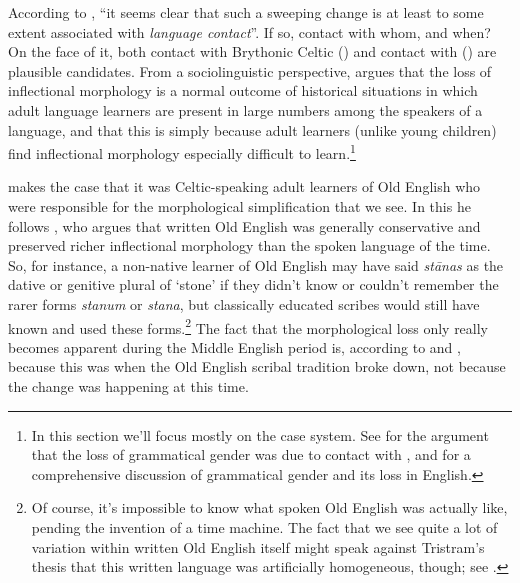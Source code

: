 According to \citet[203]{Milroy1992}, ``it seems clear that such a sweeping change is at least to some extent associated with \emph{language contact}''. If so, contact with whom, and when? On the face of it, both contact with Brythonic Celtic () and contact with  () are plausible candidates. From a sociolinguistic perspective, \citet{Trudgill2011} argues that the loss of inflectional morphology is a normal outcome of historical situations in which adult language learners are present in large numbers among the speakers of a language, and that this is simply because adult learners (unlike young children) find inflectional morphology especially difficult to learn.\footnote{In this section we'll focus mostly on the case system. See \citet[228--231]{McWhorter2002} for the argument that the loss of grammatical gender was due to contact with , and \citet{Curzan2003} for a comprehensive discussion of grammatical gender and its loss in English.}

\citet[Chapter 2]{Trudgill2011} makes the case that it was Celtic-speaking adult learners of Old English who were responsible for the morphological simplification that we see. In this he follows \citet{Tristram2004}, who argues that written Old English was generally conservative and preserved richer inflectional morphology than the spoken language of the time. So, for instance, a non-native learner of Old English may have said \emph{stānas} as the dative or genitive plural of `stone' if they didn't know or couldn't remember the rarer forms \emph{stanum} or \emph{stana}, but classically educated scribes would still have known and used these forms.\footnote{Of course, it's impossible to know what spoken Old English was actually like, pending the invention of a time machine. The fact that we see quite a lot of variation within written Old English itself might speak against Tristram's thesis that this written language was artificially homogeneous, though; see \citet[352--361]{Warner2017}.} The fact that the morphological loss only really becomes apparent during the Middle English period is, according to \citet{Tristram2004} and \citet{Trudgill2011}, because this was when the Old English scribal tradition broke down, not because the change was happening at this time.

